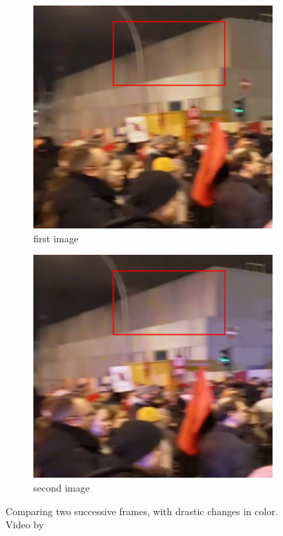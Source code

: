 \documentclass[12pt, technote]{IEEEtran}
\begin{document}
\begin{figure}[t]
    \centering
    \begin{subfigure}[b]{0.48\textwidth}
        \centering
        \includegraphics[width=\textwidth]{imgs/motion1_annotate.png}
        \caption{first image}
        \label{fig:motion1}
    \end{subfigure}
    \begin{subfigure}[b]{0.48\textwidth}
        \centering
        \includegraphics[width=\textwidth]{imgs/motion2_annotate.png}
        \caption{second image}
        \label{fig:motion2}
    \end{subfigure}
    \hfill
    \caption{Comparing two successive frames, with drastic changes in color. Video by\cite{archiveTagesschauUhr}}
    \label{fig:motion}
\end{figure}
\end{document}
